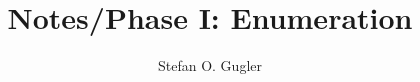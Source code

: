 \documentclass[]{article}
\title{Notes/Phase I: Enumeration}
\author{Stefan O. Gugler}
\begin{document}
\maketitle

\begin{abstract}

\end{abstract}


\end{document}
